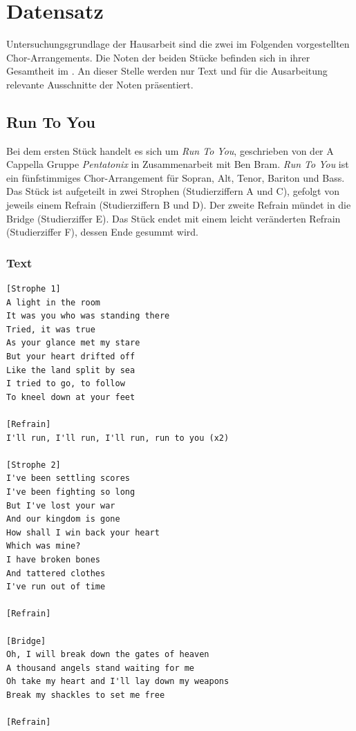 \chapter{Datensatz}
\label{chap:Datensatz}
\pagestyle{plain}

Untersuchungsgrundlage der Hausarbeit sind die zwei im Folgenden vorgestellten Chor-Arrangements. Die Noten der beiden Stücke befinden sich in ihrer Gesamtheit im . An dieser Stelle werden nur Text und für die Ausarbeitung relevante Ausschnitte der Noten präsentiert.

\section{Run To You}

Bei dem ersten Stück handelt es sich um \textit{Run To You}, geschrieben von der A Cappella Gruppe \textit{Pentatonix} in Zusammenarbeit mit Ben Bram. \textit{Run To You} ist ein fünfstimmiges Chor-Arrangement für Sopran, Alt, Tenor, Bariton und Bass. Das Stück ist aufgeteilt in zwei Strophen (Studierziffern A und C), gefolgt von jeweils einem Refrain (Studierziffern B und D). Der zweite Refrain mündet in die Bridge (Studierziffer E). Das Stück endet mit einem leicht veränderten Refrain (Studierziffer F), dessen Ende gesummt wird.

\subsection*{Text}

\begin{small}
\begin{verbatim}
[Strophe 1]
A light in the room
It was you who was standing there
Tried, it was true
As your glance met my stare
But your heart drifted off
Like the land split by sea
I tried to go, to follow
To kneel down at your feet

[Refrain]
I'll run, I'll run, I'll run, run to you (x2)

[Strophe 2]
I've been settling scores
I've been fighting so long
But I've lost your war
And our kingdom is gone
How shall I win back your heart
Which was mine?
I have broken bones
And tattered clothes
I've run out of time

[Refrain]

[Bridge]
Oh, I will break down the gates of heaven
A thousand angels stand waiting for me
Oh take my heart and I'll lay down my weapons
Break my shackles to set me free

[Refrain]
\end{verbatim}
\end{small}

